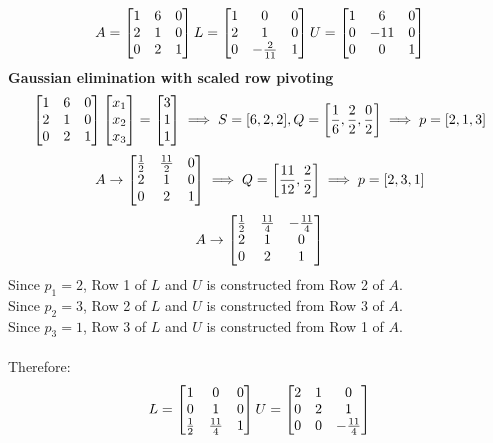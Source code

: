 \documentclass[11pt]{article}
\begin{document}
\[
A = 
\begin{bmatrix}
 1 & 6 & 0 \\
 2 & 1 & 0 \\
 0 & 2 & 1
\end{bmatrix}
L =
\begin{bmatrix}
 1 & 0 & 0\\
 2 & 1 & 0\\
 0 & -{2\over 11} &  1
\end{bmatrix}
U = 
\begin{bmatrix}
  1 & 6 & 0 \\
 0 & -11 & 0 \\
 0 & 0 & 1
\end{bmatrix}
\]
\noindent\textbf{Gaussian elimination with scaled row pivoting}
\[
\begin{bmatrix}
 1 & 6 & 0 \\
 2 & 1 & 0 \\
 0 & 2 & 1
\end{bmatrix}
\begin{bmatrix}
 x_1 \\
 x_2 \\
 x_3
\end{bmatrix} =
\begin{bmatrix}
 3 \\
 1 \\
 1
\end{bmatrix}
\implies S = [ 6, 2, 2 ], Q = \left[{1 \over 6}, {2 \over 2}, {0 \over 2}\right]
\implies p = [2, 1, 3]
\]
\[
A \rightarrow
\begin{bmatrix}
 {1 \over 2} & {11 \over 2} & 0 \\
 2   & 1    & 0 \\
 0   & 2    & 1
\end{bmatrix}
\implies Q = \left[{11 \over 12}, {2 \over 2}\right] \implies p = [2, 3, 1]
\]
\[
A \rightarrow
\begin{bmatrix}
 {1 \over 2} & {11 \over 4} & -{11 \over 4} \\
 2   & 1    & 0 \\
 0   & 2    & 1
\end{bmatrix}
\]
Since $p_1 = 2$, Row 1 of $L$ and $U$ is constructed from Row 2 of $A$.\\
Since $p_2 = 3$, Row 2 of $L$ and $U$ is constructed from Row 3 of $A$.\\
Since $p_3 = 1$, Row 3 of $L$ and $U$ is constructed from Row 1 of $A$.\\
\\
Therefore:
\[
L = \begin{bmatrix}
1 & 0 & 0 \\
0 & 1 & 0 \\
{1 \over 2} & {11 \over 4} & 1
\end{bmatrix}
U = \begin{bmatrix}
2 & 1 & 0 \\
0 & 2 & 1 \\
0 & 0 & -{11 \over 4}
\end{bmatrix}
\]
\end{document}
